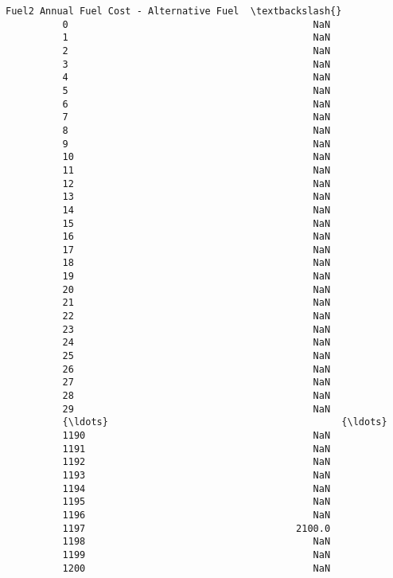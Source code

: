 \documentclass[11pt]{article}
\begin{document}
\begin{Verbatim}[commandchars=\\\{\}]
                Fuel2 Annual Fuel Cost - Alternative Fuel  \textbackslash{}
          0                                           NaN   
          1                                           NaN   
          2                                           NaN   
          3                                           NaN   
          4                                           NaN   
          5                                           NaN   
          6                                           NaN   
          7                                           NaN   
          8                                           NaN   
          9                                           NaN   
          10                                          NaN   
          11                                          NaN   
          12                                          NaN   
          13                                          NaN   
          14                                          NaN   
          15                                          NaN   
          16                                          NaN   
          17                                          NaN   
          18                                          NaN   
          19                                          NaN   
          20                                          NaN   
          21                                          NaN   
          22                                          NaN   
          23                                          NaN   
          24                                          NaN   
          25                                          NaN   
          26                                          NaN   
          27                                          NaN   
          28                                          NaN   
          29                                          NaN   
          {\ldots}                                         {\ldots}   
          1190                                        NaN   
          1191                                        NaN   
          1192                                        NaN   
          1193                                        NaN   
          1194                                        NaN   
          1195                                        NaN   
          1196                                        NaN   
          1197                                     2100.0   
          1198                                        NaN   
          1199                                        NaN   
          1200                                        NaN   

\end{Verbatim}
\end{document}
